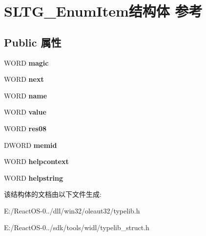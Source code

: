 \hypertarget{struct_s_l_t_g___enum_item}{}\section{S\+L\+T\+G\+\_\+\+Enum\+Item结构体 参考}
\label{struct_s_l_t_g___enum_item}
\subsection*{Public 属性}
\begin{DoxyCompactItemize}
\item 
\mbox{\label{struct_s_l_t_g___enum_item_a029a476cd5fbdcf9c59474653c18c076}} 
W\+O\+RD {\bfseries magic}
\item 
\mbox{\label{struct_s_l_t_g___enum_item_ab0968ad2e576ac6707d5b8edce5c307e}} 
W\+O\+RD {\bfseries next}
\item 
\mbox{\label{struct_s_l_t_g___enum_item_a03eeb99898e05e6aaf868a537a622c54}} 
W\+O\+RD {\bfseries name}
\item 
\mbox{\label{struct_s_l_t_g___enum_item_a6aeb8b29617a4138d2b9a48d5f4fdf9a}} 
W\+O\+RD {\bfseries value}
\item 
\mbox{\label{struct_s_l_t_g___enum_item_a18e25a1c3081fa631ab752335fd02d19}} 
W\+O\+RD {\bfseries res08}
\item 
\mbox{\label{struct_s_l_t_g___enum_item_a3ce09713fdbd89fc208cb5482b760579}} 
D\+W\+O\+RD {\bfseries memid}
\item 
\mbox{\label{struct_s_l_t_g___enum_item_a0993598f1804c83a4fcd41ef6d277533}} 
W\+O\+RD {\bfseries helpcontext}
\item 
\mbox{\label{struct_s_l_t_g___enum_item_a57fa9e02fc3fe6b9bd9f54e8bfac1a97}} 
W\+O\+RD {\bfseries helpstring}
\end{DoxyCompactItemize}


该结构体的文档由以下文件生成\+:\begin{DoxyCompactItemize}
\item 
E\+:/\+React\+O\+S-\/0../dll/win32/oleaut32/typelib.\+h\item 
E\+:/\+React\+O\+S-\/0../sdk/tools/widl/typelib\+\_\+struct.\+h\end{DoxyCompactItemize}
